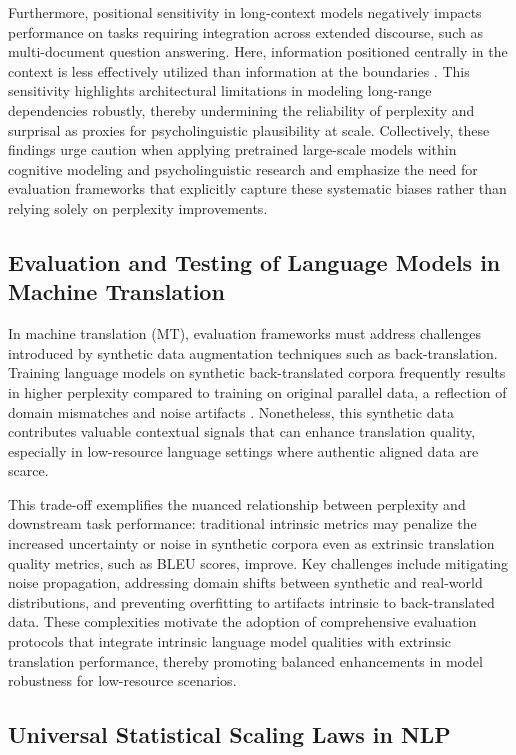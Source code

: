 Furthermore, positional sensitivity in long-context models negatively impacts performance on tasks requiring integration across extended discourse, such as multi-document question answering. Here, information positioned centrally in the context is less effectively utilized than information at the boundaries \cite{ref33}. This sensitivity highlights architectural limitations in modeling long-range dependencies robustly, thereby undermining the reliability of perplexity and surprisal as proxies for psycholinguistic plausibility at scale. Collectively, these findings urge caution when applying pretrained large-scale models within cognitive modeling and psycholinguistic research and emphasize the need for evaluation frameworks that explicitly capture these systematic biases rather than relying solely on perplexity improvements.

\subsection{Evaluation and Testing of Language Models in Machine Translation}

In machine translation (MT), evaluation frameworks must address challenges introduced by synthetic data augmentation techniques such as back-translation. Training language models on synthetic back-translated corpora frequently results in higher perplexity compared to training on original parallel data, a reflection of domain mismatches and noise artifacts \cite{ref37}. Nonetheless, this synthetic data contributes valuable contextual signals that can enhance translation quality, especially in low-resource language settings where authentic aligned data are scarce.

This trade-off exemplifies the nuanced relationship between perplexity and downstream task performance: traditional intrinsic metrics may penalize the increased uncertainty or noise in synthetic corpora even as extrinsic translation quality metrics, such as BLEU scores, improve. Key challenges include mitigating noise propagation, addressing domain shifts between synthetic and real-world distributions, and preventing overfitting to artifacts intrinsic to back-translated data. These complexities motivate the adoption of comprehensive evaluation protocols that integrate intrinsic language model qualities with extrinsic translation performance, thereby promoting balanced enhancements in model robustness for low-resource scenarios.

\subsection{Universal Statistical Scaling Laws in NLP}

